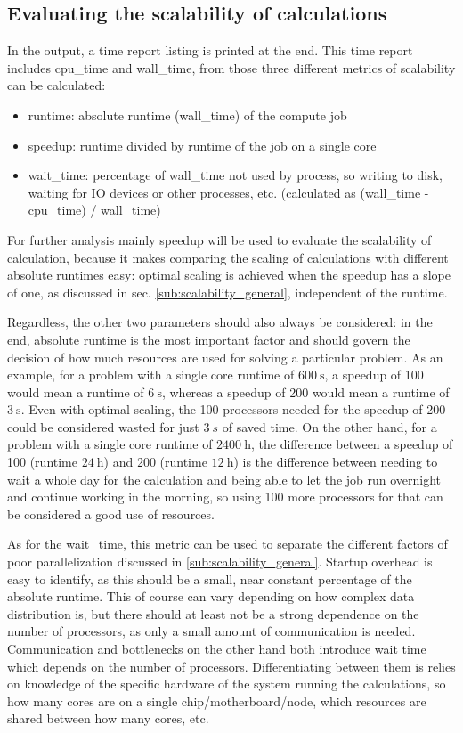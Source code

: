 \documentclass[main.tex]{subfiles}
\begin{document}
\subsection{Evaluating the scalability of \QE calculations}\label{sub:scalability_qe}

In the \QE output, a time report listing is printed at the end.
This time report includes \gls{cpu_time} and \gls{wall_time}, from those three different metrics of scalability can be calculated:
\begin{itemize}
    \item runtime: absolute runtime (\gls{wall_time}) of the compute job
    \item speedup: runtime divided by runtime of the job on a single core
    \item \gls{wait_time}: percentage of \gls{wall_time} not used by \QE process, so writing to disk, waiting for IO devices or other processes, etc. (calculated as (\gls{wall_time} - \gls{cpu_time}) / \gls{wall_time})
\end{itemize}
For further analysis mainly speedup will be used to evaluate the scalability of \QE calculation, because it makes comparing the scaling of calculations with different absolute runtimes easy: optimal scaling is achieved when the speedup has a slope of one, as discussed in sec. \ref{sub:scalability_general}, independent of the runtime.

Regardless, the other two parameters should also always be considered: in the end, absolute runtime is the most important factor and should govern the decision of how much resources are used for solving a particular problem.
As an example, for a problem with a single core runtime of \(\SI{600}{\s}\), a speedup of 100 would mean a runtime of \(\SI{6}{\s}\), whereas a speedup of 200 would mean a runtime of \(\SI{3}{\s}\).
Even with optimal scaling, the 100 processors needed for the speedup of 200 could be considered wasted for just \(\SI{3}{s}\) of saved time.
On the other hand, for a problem with a single core runtime of \(\SI{2400}{\hour}\), the difference between a speedup of 100 (runtime \(\SI{24}{\hour}\)) and 200 (runtime \(\SI{12}{\hour}\)) is the difference between needing to wait a whole day for the calculation and being able to let the job run overnight and continue working in the morning, so using 100 more processors for that can be considered a good use of resources.

As for the \gls{wait_time}, this metric can be used to separate the different factors of poor parallelization discussed in \ref{sub:scalability_general}.
Startup overhead is easy to identify, as this should be a small, near constant percentage of the absolute runtime.
This of course can vary depending on how complex data distribution is, but there should at least not be a strong dependence on the number of processors, as only a small amount of communication is needed.
Communication and bottlenecks on the other hand both introduce wait time which depends on the number of processors.
Differentiating between them is relies on knowledge of the specific hardware of the system running the calculations, so how many cores are on a single chip/motherboard/node, which resources are shared between how many cores, etc.
\end{document}
